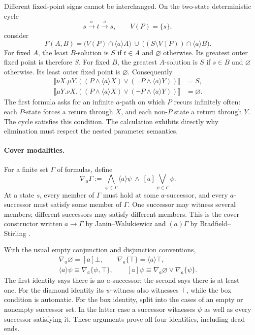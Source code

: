 Different fixed-point signs
cannot be interchanged.
On the two-state deterministic
cycle
\[
 s\xrightarrow{a}t\xrightarrow{a}s,
 \qquad V(P)=\{s\},
\]
consider
\[
 F(A,B)=
 \bigl(V(P)\cap\langle a\rangle A\bigr)
 \ \cup\
 \bigl((S\setminus V(P))\cap\langle a\rangle B\bigr).
\]
For fixed \(A\), the least
\(B\)-solution is \(S\) if
\(t\in A\) and \(\varnothing\)
otherwise. Its greatest outer
fixed point is therefore \(S\).
For fixed \(B\), the greatest
\(A\)-solution is \(S\) if
\(s\in B\) and \(\varnothing\)
otherwise. Its least outer
fixed point is \(\varnothing\).
Consequently
\[
\begin{aligned}
 \llbracket\nu X.\mu Y.
    ((P\land\langle a\rangle X)
       \lor(\neg P\land\langle a\rangle Y))\rrbracket
     &=S,\\
 \llbracket\mu Y.\nu X.
    ((P\land\langle a\rangle X)
       \lor(\neg P\land\langle a\rangle Y))\rrbracket
     &=\varnothing.
\end{aligned}
\]
The first formula asks for an
infinite \(a\)-path on which
\(P\) recurs infinitely often:
each \(P\)-state forces a return
through \(X\), and each non-\(P\)
state a return through \(Y\).
The cycle satisfies this condition.
The calculation exhibits directly
why elimination must respect the
nested parameter semantics.

\paragraph{Cover modalities.}
\label{sec:p09-mu-cover-modalities}
For a finite set \(\Gamma\) of formulas, define
\[
 \nabla_a\Gamma
   :=\bigwedge_{\psi\in\Gamma}\langle a\rangle\psi
       \ \land\ [a]\bigvee_{\psi\in\Gamma}\psi.
\]
At a state \(s\), every member of \(\Gamma\)
must hold at some \(a\)-successor, and every
\(a\)-successor must satisfy some member
of \(\Gamma\). One successor may witness
several members; different successors may
satisfy different members.
This is the cover constructor written
\(a\to\Gamma\) by Janin--Walukiewicz
and \((a)\Gamma\) by Bradfield--Stirling
\cite[def.~2.5 of the author version]{JaninWalukiewicz1995}.

With the usual empty conjunction and
disjunction conventions,
\[
\begin{gathered}
 \nabla_a\varnothing=[a]\bot,\qquad
 \nabla_a\{\top\}=\langle a\rangle\top,\\
 \langle a\rangle\psi
       \equiv\nabla_a\{\psi,\top\},\qquad
 [a]\psi\equiv
       \nabla_a\varnothing\lor\nabla_a\{\psi\}.
\end{gathered}
\]
The first identity says there is no
\(a\)-successor; the second says there
is at least one. For the diamond
identity its \(\psi\)-witness also
witnesses \(\top\), while the box
condition is automatic. For the
box identity, split into the cases
of an empty or nonempty successor
set. In the latter case a successor
witnesses \(\psi\) as well as every
successor satisfying it. These
arguments prove all four identities,
including dead ends.


